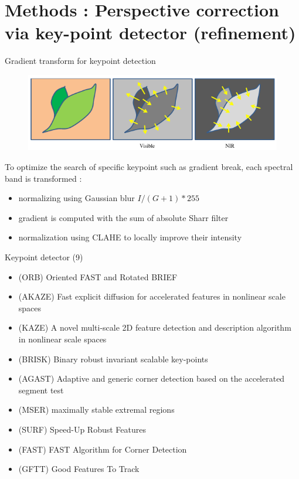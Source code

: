 \documentclass{beamer}
\begin{document}
	\section{Methods : Perspective correction via key-point detector (refinement)}
		\begin{frame}{Gradient transform for keypoint detection}
			\begin{figure}
				\includegraphics[width=0.7\linewidth]{../figures/contrast-inversion.png}
			\end{figure}
			
			To optimize the search of specific keypoint such as gradient break,
			each spectral band is transformed :
			\begin{itemize}
				\item normalizing using Gaussian blur $I/(G+1)*255$ 
				\item gradient is computed with the sum of absolute Sharr filter
				\item normalization using CLAHE to locally improve their intensity
			\end{itemize}
		\end{frame}
	
		\begin{frame}{Keypoint detector (9)}
			\begin{itemize}
				\item (ORB) Oriented FAST and Rotated BRIEF
				\item (AKAZE) Fast explicit diffusion for accelerated features in nonlinear scale spaces
				\item (KAZE) A novel multi-scale 2D feature detection and description algorithm in nonlinear scale spaces
				\item (BRISK) Binary robust invariant scalable key-points
				\item (AGAST) Adaptive and generic corner detection based on the accelerated segment test
				\item (MSER) maximally stable extremal regions
				\item (SURF) Speed-Up Robust Features
				\item (FAST) FAST Algorithm for Corner Detection
				\item (GFTT) Good Features To Track
			\end{itemize}
		\end{frame}
	
\end{document}
